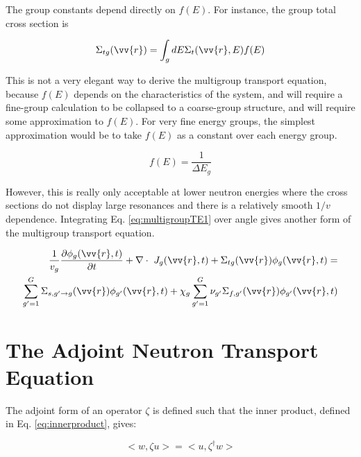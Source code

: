 \documentclass[10pt]{article}
\begin{document}
\begin{flushleft}
The group constants depend directly on \(f(E)\). For instance, the group total cross section is

\begin{equation}
\label{eq:multigroupTE1_constants1}
\Sigma_{tg}(\vv{r}) = \int_{g} dE \Sigma_t(\vv{r}, E) f(E)
\end{equation}

This is not a very elegant way to derive the multigroup transport equation, because \(f(E)\) depends on the characteristics of the system, and will require a fine-group calculation to be collapsed to a coarse-group structure, and will require some approximation to \(f(E)\). For very fine energy groups, the simplest approximation would be to take \(f(E)\) as a constant over each energy group.

\begin{equation}
\label{eq:FineGroupf_E}
f(E) = \frac{1}{\Delta E_g}
\end{equation}

However, this is really only acceptable at lower neutron energies where the cross sections do not display large resonances and there is a relatively smooth \(1/v\) dependence. Integrating Eq. \ref{eq:multigroupTE1} over angle gives another form of the multigroup transport equation.

\begin{equation}
\label{eq:multigroupTE2}
\begin{aligned}
\frac{1}{v_g} \frac{\partial\phi_g(\vv{r}, t)}{\partial t} + \nabla\cdot\ J_g(\vv{r}, t) + \Sigma_{tg}(\vv{r})\phi_g(\vv{r}, t) =\\
\sum_{g'=1}^{G} \Sigma_{s, g'\rightarrow g}(\vv{r})\phi_{g'}(\vv{r}, t) + \chi_g \sum_{g'=1}^{G} \nu_{g'}\Sigma_{f,g'}(\vv{r})\phi_{g'}(\vv{r}, t)
\end{aligned}
\end{equation}



\clearpage
\section{The Adjoint Neutron Transport Equation}

The adjoint form of an operator \(\zeta\) is defined such that the inner product, defined in Eq. \ref{eq:innerproduct}, gives:

\begin{equation}
\label{eq:AdjointDefinition}
<w, \zeta u> = <u, \zeta^\dagger w>
\end{equation}


\end{flushleft}
\end{document}
